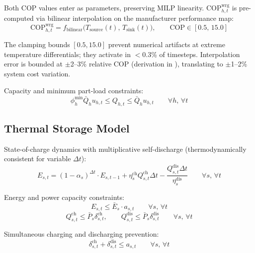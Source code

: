 \documentclass[review,3p]{elsarticle}
\begin{document}
Both COP values enter as parameters, preserving MILP linearity.
$\mathrm{COP}_{h,t}^{\mathrm{wrg}}$ is pre-computed via bilinear
interpolation on the manufacturer performance map:
\begin{equation}
\mathrm{COP}_{h,t}^{\mathrm{wrg}} = f_{\mathrm{bilinear}}\big(
T_{\mathrm{source}}(t),\, T_{\mathrm{sink}}(t)\big),
\qquad \mathrm{COP} \in [0.5,\, 15.0]
\label{eq:cop_lookup}
\end{equation}

The clamping bounds $[0.5, 15.0]$ prevent numerical artifacts at
extreme temperature differentials; they activate in $<$0.3\% of
timesteps. Interpolation error is bounded at $\pm$2--3\% relative
COP (derivation in ), translating to $\pm$1--2\%
system cost variation.

Capacity and minimum part-load constraints:
\begin{equation}
\phi_h^{\mathrm{min}} \bar{Q}_h u_{h,t} \leq Q_{h,t}
\leq \bar{Q}_h u_{h,t}
\qquad \forall h,\, \forall t
\label{eq:hp_cap}
\end{equation}

\subsection{Thermal Storage Model}
\label{sec:model_storage}

State-of-charge dynamics with multiplicative self-discharge
(thermodynamically consistent for variable $\Delta t$):
\begin{equation}
E_{s,t} = (1-\alpha_s)^{\Delta t} \cdot E_{s,t-1}
+ \eta_{s}^{\mathrm{ch}} Q_{s,t}^{\mathrm{ch}} \Delta t
- \frac{Q_{s,t}^{\mathrm{dis}} \Delta t}{\eta_{s}^{\mathrm{dis}}}
\qquad \forall s,\, \forall t
\label{eq:storage_soc}
\end{equation}

Energy and power capacity constraints:
\begin{equation}
E_{s,t} \leq \bar{E}_s \cdot a_{s,t}
\qquad \forall s,\, \forall t
\label{eq:storage_cap_E}
\end{equation}
\begin{equation}
Q_{s,t}^{\mathrm{ch}} \leq \bar{P}_s \delta_{s,t}^{\mathrm{ch}},
\qquad
Q_{s,t}^{\mathrm{dis}} \leq \bar{P}_s \delta_{s,t}^{\mathrm{dis}}
\qquad \forall s,\, \forall t
\label{eq:storage_cap_P}
\end{equation}

Simultaneous charging and discharging prevention:
\begin{equation}
\delta_{s,t}^{\mathrm{ch}} + \delta_{s,t}^{\mathrm{dis}}
\leq a_{s,t}
\qquad \forall s,\, \forall t
\label{eq:storage_excl}
\end{equation}
\end{document}
